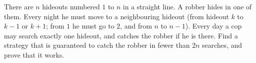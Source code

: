 There are $n$ hideouts numbered $1$ to $n$ in a straight line. A robber hides in one of them. Every night he must move to a neighbouring hideout (from hideout $k$ to $k-1$ or $k+1$; from $1$ he must go to $2$, and from $n$ to $n-1$). Every day a cop may search exactly one hideout, and catches the robber if he is there. Find a strategy that is guaranteed to catch the robber in fewer than $2n$ searches, and prove that it works.
